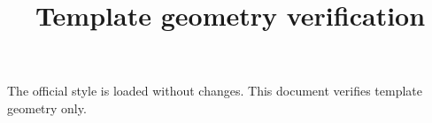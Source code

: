 \documentclass{article}
\begin{document}
\title{Template geometry verification}
\maketitle
The official style is loaded without changes. This document verifies template geometry only.
\end{document}
